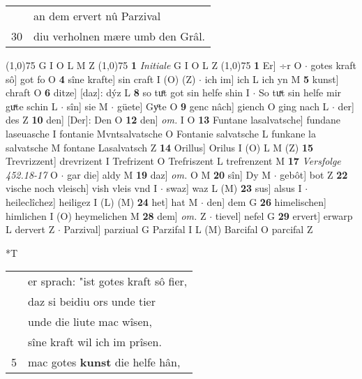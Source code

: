 \documentclass[8pt,a4paper,notitlepage]{article}
\begin{document}
\begin{table}[ht]
\begin{minipage}[t]{0.5\linewidth}
\begin{tabular}{rl}
 & an dem ervert nû Parzival\\ 
30 & diu verholnen mære umb den Grâl.\\ 
\end{tabular}
\scriptsize
\line(1,0){75} \newline
G I O L M Z \newline
\line(1,0){75} \newline
\textbf{1} \textit{Initiale} G I O L Z  \newline
\line(1,0){75} \newline
\textbf{1} Er] ÷r O  $\cdot$ gotes kraft sô] got fo O \textbf{4} sîne krafte] sin craft I (O) (Z)  $\cdot$ ich im] ich L ich yn M \textbf{5} kunst] chraft O \textbf{6} ditze] [daz]: dýz L \textbf{8} so tuͤt got sin helfe shin I  $\cdot$ So tuͯt sin helfe mir guͯte schin L  $\cdot$ sîn] sie M  $\cdot$ güete] Gyͦte O \textbf{9} genc nâch] giench O ging nach L  $\cdot$ der] des Z \textbf{10} den] [Der]: Den O \textbf{12} den] \textit{om.} I O \textbf{13} Funtane lasalvatsche] fundane laseuasche I fontanie Mvntsalvatsche O Fontanie salvatsche L funkane la salvatsche M fontane Lasalvatsch Z \textbf{14} Orillus] Orilus I (O) L M (Z) \textbf{15} Trevrizzent] drevrizent I Trefrizent O Trefriszent L trefrenzent M \textbf{17} \textit{Versfolge 452.18-17} O   $\cdot$ gar die] aldy M \textbf{19} daz] \textit{om.} O M \textbf{20} sîn] Dy M  $\cdot$ gebôt] bot Z \textbf{22} vische noch vleisch] vish vleis vnd I  $\cdot$ swaz] waz L (M) \textbf{23} sus] alsus I  $\cdot$ heileclîchez] heiligez I (L) (M) \textbf{24} het] hat M  $\cdot$ den] dem G \textbf{26} himelischen] himlichen I (O) heymelichen M \textbf{28} dem] \textit{om.} Z  $\cdot$ tievel] nefel G \textbf{29} ervert] erwarp L dervert Z  $\cdot$ Parzival] parziual G Parzifal I L (M) Barcifal O parcifal Z \newline
\end{minipage}
\hspace{0.5cm}
\begin{minipage}[t]{0.5\linewidth}
\small
\begin{center}*T
\end{center}
\begin{tabular}{rl}
 & er sprach: "ist gotes kraft sô fier,\\ 
 & daz si beidiu ors unde tier\\ 
 & unde die liute mac wîsen,\\ 
 & sîne kraft wil ich im prîsen.\\ 
5 & mac gotes \textbf{kunst} die helfe hân,\\ 

\end{tabular}
\end{minipage}
\end{table}
\end{document}
